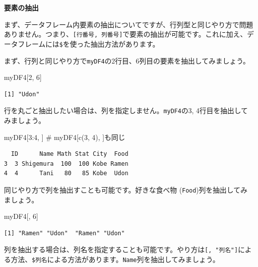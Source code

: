 \documentclass[
  a4paper,
  pandoc,
  ja=standard,
  jafont=haranoaji]{bxjsbook}
\newenvironment{Shaded}{\begin{snugshade}}{\end{snugshade}}
\newcommand{\CommentTok}[1]{\textcolor[rgb]{0.37,0.37,0.37}{#1}}
\newcommand{\DecValTok}[1]{\textcolor[rgb]{0.68,0.00,0.00}{#1}}
\newcommand{\NormalTok}[1]{\textcolor[rgb]{0.00,0.48,0.65}{#1}}
\newcommand{\SpecialCharTok}[1]{\textcolor[rgb]{0.37,0.37,0.37}{#1}}
\begin{document}
\textbf{要素の抽出}

まず、データフレーム内要素の抽出についてですが、行列型と同じやり方で問題ありません。つまり、\texttt{{[}行番号,\ 列番号{]}}で要素の抽出が可能です。これに加え、データフレームには\texttt{\$}を使った抽出方法があります。

まず、行列と同じやり方で\texttt{myDF4}の2行目、6列目の要素を抽出してみましょう。

\begin{Shaded}
\begin{Highlighting}[numbers=left,,]
\NormalTok{myDF4[}\DecValTok{2}\NormalTok{, }\DecValTok{6}\NormalTok{]}
\end{Highlighting}
\end{Shaded}

\begin{verbatim}
[1] "Udon"
\end{verbatim}

行を丸ごと抽出したい場合は、列を指定しません。\texttt{myDF4}の3,
4行目を抽出してみましょう。

\begin{Shaded}
\begin{Highlighting}[numbers=left,,]
\NormalTok{myDF4[}\DecValTok{3}\SpecialCharTok{:}\DecValTok{4}\NormalTok{, ] }\CommentTok{\# myDF4[c(3, 4), ]も同じ}
\end{Highlighting}
\end{Shaded}

\begin{verbatim}
  ID      Name Math Stat City  Food
3  3 Shigemura  100  100 Kobe Ramen
4  4      Tani   80   85 Kobe  Udon
\end{verbatim}

同じやり方で列を抽出すことも可能です。好きな食べ物
(\texttt{Food})列を抽出してみましょう。

\begin{Shaded}
\begin{Highlighting}[numbers=left,,]
\NormalTok{myDF4[, }\DecValTok{6}\NormalTok{]}
\end{Highlighting}
\end{Shaded}

\begin{verbatim}
[1] "Ramen" "Udon"  "Ramen" "Udon" 
\end{verbatim}

列を抽出する場合は、列名を指定することも可能です。やり方は\texttt{{[},\ "列名"{]}}による方法、\texttt{\$列名}による方法があります。\texttt{Name}列を抽出してみましょう。
\end{document}
